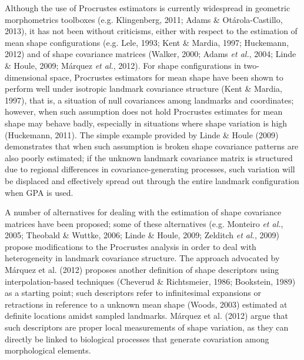 \documentclass[12pt,twoside]{report}
\begin{document}
Although the use of Procrustes estimators is currently widespread in
geometric morphometrics toolboxes (e.g. Klingenberg, 2011; Adams \&
Otárola-Castillo, 2013), it has not been without criticisms, either with
respect to the estimation of mean shape configurations (e.g. Lele, 1993;
Kent \& Mardia, 1997; Huckemann, 2012) and of shape covariance matrices
(Walker, 2000; Adams \emph{et al.}, 2004; Linde \& Houle, 2009; Márquez
\emph{et al.}, 2012). For shape configurations in two-dimensional space,
Procrustes estimators for mean shape have been shown to perform well
under isotropic landmark covariance structure (Kent \& Mardia, 1997),
that is, a situation of null covariances among landmarks and
coordinates; however, when such assumption does not hold Procrustes
estimates for mean shape may behave badly, especially in situations
where shape variation is high (Huckemann, 2011). The simple example
provided by Linde \& Houle (2009) demonstrates that when such assumption
is broken shape covariance patterns are also poorly estimated; if the
unknown landmark covariance matrix is structured due to regional
differences in covariance-generating processes, such variation will be
displaced and effectively spread out through the entire landmark
configuration when GPA is used.

A number of alternatives for dealing with the estimation of shape
covariance matrices have been proposed; some of these alternatives (e.g.
Monteiro \emph{et al.}, 2005; Theobald \& Wuttke, 2006; Linde \& Houle,
2009; Zelditch \emph{et al.}, 2009) propose modifications to the
Procrustes analysis in order to deal with heterogeneity in landmark
covariance structure. The approach advocated by Márquez et al. (2012)
proposes another definition of shape descriptors using
interpolation-based techniques (Cheverud \& Richtsmeier, 1986;
Bookstein, 1989) as a starting point; such descriptors refer to
infinitesimal expansions or retractions in reference to a unknown mean
shape (Woods, 2003) estimated at definite locations amidst sampled
landmarks. Márquez et al. (2012) argue that such descriptors are proper
local measurements of shape variation, as they can directly be linked to
biological processes that generate covariation among morphological
elements.
\end{document}

